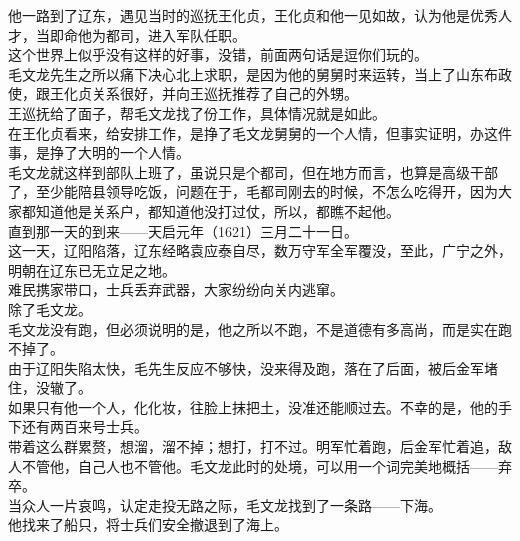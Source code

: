 \begin{multicols}{\theparacolNo}
他一路到了辽东，遇见当时的巡抚王化贞，王化贞和他一见如故，认为他是优秀人才，当即命他为都司，进入军队任职。\\

这个世界上似乎没有这样的好事，没错，前面两句话是逗你们玩的。\\

毛文龙先生之所以痛下决心北上求职，是因为他的舅舅时来运转，当上了山东布政使，跟王化贞关系很好，并向王巡抚推荐了自己的外甥。\\

王巡抚给了面子，帮毛文龙找了份工作，具体情况就是如此。\\

在王化贞看来，给安排工作，是挣了毛文龙舅舅的一个人情，但事实证明，办这件事，是挣了大明的一个人情。\\

毛文龙就这样到部队上班了，虽说只是个都司，但在地方而言，也算是高级干部了，至少能陪县领导吃饭，问题在于，毛都司刚去的时候，不怎么吃得开，因为大家都知道他是关系户，都知道他没打过仗，所以，都瞧不起他。\\

直到那一天的到来——天启元年（1621）三月二十一日。\\

这一天，辽阳陷落，辽东经略袁应泰自尽，数万守军全军覆没，至此，广宁之外，明朝在辽东已无立足之地。\\

难民携家带口，士兵丢弃武器，大家纷纷向关内逃窜。\\

除了毛文龙。\\

毛文龙没有跑，但必须说明的是，他之所以不跑，不是道德有多高尚，而是实在跑不掉了。\\

由于辽阳失陷太快，毛先生反应不够快，没来得及跑，落在了后面，被后金军堵住，没辙了。\\

如果只有他一个人，化化妆，往脸上抹把土，没准还能顺过去。不幸的是，他的手下还有两百来号士兵。\\

带着这么群累赘，想溜，溜不掉；想打，打不过。明军忙着跑，后金军忙着追，敌人不管他，自己人也不管他。毛文龙此时的处境，可以用一个词完美地概括——弃卒。\\

当众人一片哀鸣，认定走投无路之际，毛文龙找到了一条路——下海。\\

他找来了船只，将士兵们安全撤退到了海上。\\


\end{multicols}
